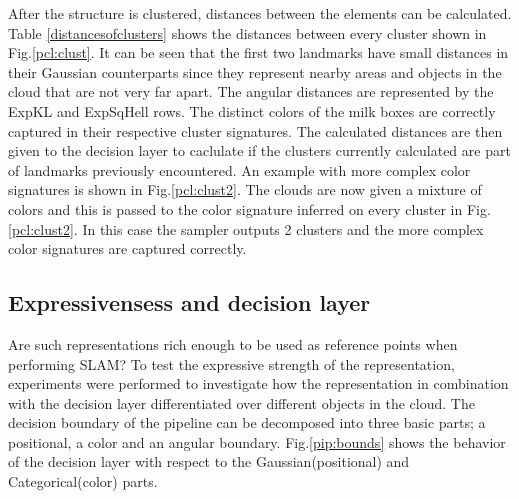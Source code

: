 \documentclass[twoside,hidelinks]{article}
\begin{document}
After the structure is clustered, distances between the elements can be calculated. Table \ref{distancesofclusters} shows the distances between every cluster shown in Fig.\ref{pcl:clust}. It can be seen that the first two landmarks have small distances in their Gaussian counterparts since they represent nearby areas and objects in the cloud that are not very far apart. The angular distances are represented by the ExpKL and ExpSqHell rows. The distinct colors of the milk boxes are correctly captured in their respective cluster signatures. The calculated distances are then given to the decision layer to caclulate if the clusters currently calculated are part of landmarks previously encountered.
An example with more complex color signatures is shown in Fig.\ref{pcl:clust2}. The clouds are now given a mixture of colors and this is passed to the color signature inferred on every cluster in Fig.\ref{pcl:clust2}. In this case the sampler outputs 2 clusters and the more complex color signatures are captured correctly. 

\subsection{Expressivensess and decision layer}

Are such representations rich enough to be used as reference points when performing SLAM?
To test the expressive strength of the representation, experiments were performed to investigate how the representation in combination with the decision layer differentiated over different objects in the cloud. 
The decision boundary of the pipeline can be decomposed into three basic parts; a positional, a color and an angular boundary. Fig.\ref{pip:bounds} shows the behavior of the decision layer with respect to the Gaussian(positional) and Categorical(color) parts. 
    
\end{document}
